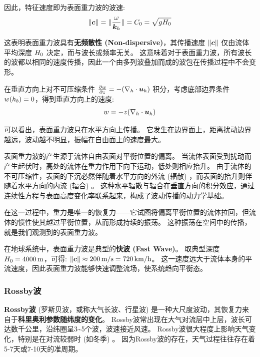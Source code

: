 因此，特征速度即为表面重力波的波速:
\begin{equation}
    \lVert \bm{c} \rVert = \lVert \frac{\omega}{\bm{k}_h} \rVert = C_0 = \sqrt{g H_0}
    \label{eq:gravity_wave_speed}
\end{equation}

这表明表面重力波具有\textbf{无频散性 (Non-dispersive)}，其传播速度 $\lVert \bm{c} \rVert$ 仅由流体平均深度 $H_0$ 决定，而与波长或频率无关。
这意味着对于表面重力波，所有波长的波都以相同的速度传播，因此一个由多列波叠加而成的波包在传播过程中不会变形。

在垂直方向上对不可压缩条件 $\pde{w}{z} = -(\nabla_h \cdot \vel_h)$ 积分，考虑底部边界条件 $w(h_b) = 0$，得到垂直方向上的速度:
\begin{equation}
    w = -z (\nabla_h \cdot \bm{u}_h)
    \label{eq:vertical_velocity_shallow}
\end{equation}

可以看出，表面重力波只在水平方向上传播。
它发生在边界面上，距离扰动边界越远，波动越不明显，振幅在自由面上的速度最大。

\begin{insightbox}[表面重力波的物理图景]
    表面重力波的产生源于流体自由表面对平衡位置的偏离。
    当流体表面受到扰动而产生起伏时，高处的流体在重力作用下向下运动，低处则相应抬升。
    由于流体的不可压缩性，表面的下沉必然伴随着水平方向的外流 (辐散) ，而表面的抬升则伴随着水平方向的内流 (辐合) 。
    这种水平辐散与辐合在垂直方向的积分效应，通过连续性方程与表面高度变化率联系起来，构成了波动传播的动力学基础。

    在这一过程中，重力是唯一的恢复力——它试图将偏离平衡位置的流体拉回，但流体的惯性使其越过平衡位置，从而形成持续的振荡。
    这种振荡在空间中的传播，就是我们观测到的表面重力波。
\end{insightbox}

在地球系统中，表面重力波是典型的\textbf{快波 (Fast Wave)}。
取典型深度 $H_0 = 4000\,\mathrm{m}$，可得: $\lVert \bm{c} \rVert \approx 200\,\mathrm{m/s} = 720\,\mathrm{km/h}$。
这一速度远大于流体本身的平流速度，因此表面重力波能够快速调整流场，使系统趋向平衡态。

\subsubsection{Rossby波}

\textbf{Rossby波} (罗斯贝波，或称大气长波、行星波) 是一种大尺度波动，其恢复力来自于\textbf{科里奥利参数随纬度的变化}。
Rossby波常出现在大气对流层中上层，波长可达数千公里，沿纬圈呈3\textasciitilde5个波，波速接近风速。
Rossby波很大程度上影响天气变化，特别是在对流较弱时 (如冬季) 。
因为Rossby波的存在，天气过程往往存在着5-7天或7-10天的准周期。

